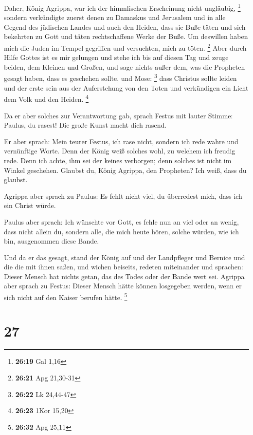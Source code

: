  Daher, König Agrippa, war ich der himmlischen
Erscheinung nicht ungläubig, \footnote{\textbf{26:19} Gal 1,16}
 sondern verkündigte zuerst denen zu Damaskus und
Jerusalem und in alle Gegend des jüdischen Landes und auch den Heiden,
dass sie Buße täten und sich bekehrten zu Gott und täten rechtschaffene
Werke der Buße.  Um deswillen haben mich die Juden im
Tempel gegriffen und versuchten, mich zu töten. \footnote{\textbf{26:21}
  Apg 21,30-31}  Aber durch Hilfe Gottes ist es mir
gelungen und stehe ich bis auf diesen Tag und zeuge beiden, dem Kleinen
und Großen, und sage nichts außer dem, was die Propheten gesagt haben,
dass es geschehen sollte, und Mose: \footnote{\textbf{26:22} Lk 24,44-47}
 dass Christus sollte leiden und der erste sein aus der
Auferstehung von den Toten und verkündigen ein Licht dem Volk und den
Heiden. \footnote{\textbf{26:23} 1Kor 15,20}

 Da er aber solches zur Verantwortung gab, sprach Festus
mit lauter Stimme: Paulus, du rasest! Die große Kunst macht dich rasend.

 Er aber sprach: Mein teurer Festus, ich rase nicht,
sondern ich rede wahre und vernünftige Worte.  Denn der
König weiß solches wohl, zu welchem ich freudig rede. Denn ich achte,
ihm sei der keines verborgen; denn solches ist nicht im Winkel
geschehen.  Glaubst du, König Agrippa, den Propheten? Ich
weiß, dass du glaubst.

 Agrippa aber sprach zu Paulus: Es fehlt nicht viel, du
überredest mich, dass ich ein Christ würde.

 Paulus aber sprach: Ich wünschte vor Gott, es fehle nun
an viel oder an wenig, dass nicht allein du, sondern alle, die mich
heute hören, solche würden, wie ich bin, ausgenommen diese Bande.

 Und da er das gesagt, stand der König auf und der
Landpfleger und Bernice und die die mit ihnen saßen,  und
wichen beiseits, redeten miteinander und sprachen: Dieser Mensch hat
nichts getan, das des Todes oder der Bande wert sei. 
Agrippa aber sprach zu Festus: Dieser Mensch hätte können losgegeben
werden, wenn er sich nicht auf den Kaiser berufen hätte. \footnote{\textbf{26:32}
  Apg 25,11}

\hypertarget{section-6}{%
\section{27}\label{section-6}}


